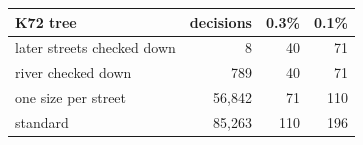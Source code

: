 \begin{tabular}{lrrr}
\toprule
K72 tree & decisions & 0.3\% & 0.1\% \\ \midrule
later streets checked down & 8 & 40 & 71 \\
river checked down & 789 & 40 & 71 \\
one size per street & 56,842 & 71 & 110 \\
standard & 85,263 & 110 & 196 \\
\bottomrule
\end{tabular}

